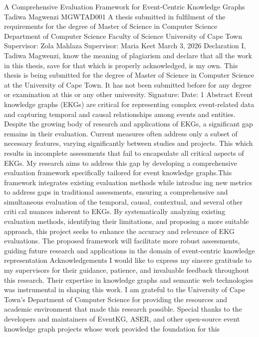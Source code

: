 A Comprehensive Evaluation Framework
for Event-Centric Knowledge Graphs
Tadiwa Magwenzi
MGWTAD001
A thesis submitted in fulfilment of the requirements for the degree of
Master of Science in Computer Science
Department of Computer Science
Faculty of Science
University of Cape Town
Supervisor: Zola Mahlaza
Supervisor: Maria Keet
March 3, 2026
Declaration
I, Tadiwa Magwenzi, know the meaning of plagiarism and declare that all the work in
this thesis, save for that which is properly acknowledged, is my own. This thesis is being
submitted for the degree of Master of Science in Computer Science at the University of
Cape Town. It has not been submitted before for any degree or examination at this or
any other university.
Signature:
Date:
1
Abstract
Event knowledge graphs (EKGs) are critical for representing complex event-related data
and capturing temporal and causal relationships among events and entities. Despite the
growing body of research and applications of EKGs, a significant gap remains in their
evaluation. Current measures often address only a subset of necessary features, varying
significantly between studies and projects. This which results in incomplete assessments
that fail to encapsulate all critical aspects of EKGs. My research aims to address this
gap by developing a comprehensive evaluation framework specifically tailored for event
knowledge graphs.This framework integrates existing evaluation methods while introducing new metrics to address gaps in traditional assessments, ensuring a comprehensive
and simultaneous evaluation of the temporal, causal, contextual, and several other critical nuances inherent to EKGs. By systematically analyzing existing evaluation methods,
identifying their limitations, and proposing a more suitable approach, this project seeks
to enhance the accuracy and relevance of EKG evaluations. The proposed framework
will facilitate more robust assessments, guiding future research and applications in the
domain of event-centric knowledge representation
Acknowledgements
I would like to express my sincere gratitude to my supervisors for their guidance, patience,
and invaluable feedback throughout this research. Their expertise in knowledge graphs
and semantic web technologies was instrumental in shaping this work.
I am grateful to the University of Cape Town’s Department of Computer Science for
providing the resources and academic environment that made this research possible.
Special thanks to the developers and maintainers of EventKG, ASER, and other
open-source event knowledge graph projects whose work provided the foundation for this
